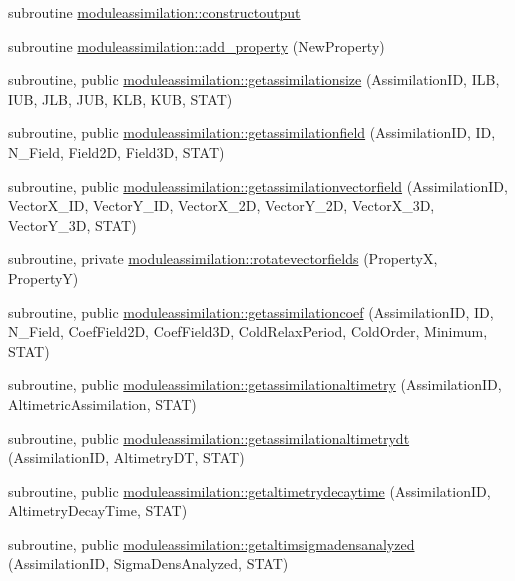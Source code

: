 \begin{DoxyCompactItemize}
\item 
subroutine \mbox{\hyperlink{namespacemoduleassimilation_a0290dba29cfc2f2e50954134308fdd93}{moduleassimilation\+::constructoutput}}
\item 
subroutine \mbox{\hyperlink{namespacemoduleassimilation_a59854402d2db7e0920208b8293922fc2}{moduleassimilation\+::add\+\_\+property}} (New\+Property)
\item 
subroutine, public \mbox{\hyperlink{namespacemoduleassimilation_a9dcf23578dc00d565791f0b2ce1edc7d}{moduleassimilation\+::getassimilationsize}} (Assimilation\+ID, I\+LB, I\+UB, J\+LB, J\+UB, K\+LB, K\+UB, S\+T\+AT)
\item 
subroutine, public \mbox{\hyperlink{namespacemoduleassimilation_aa6ac00eae8c819e287924553d8d10638}{moduleassimilation\+::getassimilationfield}} (Assimilation\+ID, ID, N\+\_\+\+Field, Field2D, Field3D, S\+T\+AT)
\item 
subroutine, public \mbox{\hyperlink{namespacemoduleassimilation_a3f99df6f8207db00fe69fa4d172335b1}{moduleassimilation\+::getassimilationvectorfield}} (Assimilation\+ID, Vector\+X\+\_\+\+ID, Vector\+Y\+\_\+\+ID, Vector\+X\+\_\+2D, Vector\+Y\+\_\+2D, Vector\+X\+\_\+3D, Vector\+Y\+\_\+3D, S\+T\+AT)
\item 
subroutine, private \mbox{\hyperlink{namespacemoduleassimilation_a91d65081df0418d8a1b46cb4548710f3}{moduleassimilation\+::rotatevectorfields}} (PropertyX, PropertyY)
\item 
subroutine, public \mbox{\hyperlink{namespacemoduleassimilation_aeb67db12f57e948ab0d21c07cf0f3ee4}{moduleassimilation\+::getassimilationcoef}} (Assimilation\+ID, ID, N\+\_\+\+Field, Coef\+Field2D, Coef\+Field3D, Cold\+Relax\+Period, Cold\+Order, Minimum, S\+T\+AT)
\item 
subroutine, public \mbox{\hyperlink{namespacemoduleassimilation_ae8923d911da53170ca8bc79256ecfaee}{moduleassimilation\+::getassimilationaltimetry}} (Assimilation\+ID, Altimetric\+Assimilation, S\+T\+AT)
\item 
subroutine, public \mbox{\hyperlink{namespacemoduleassimilation_a4c4fab1da99106327a65575667e03252}{moduleassimilation\+::getassimilationaltimetrydt}} (Assimilation\+ID, Altimetry\+DT, S\+T\+AT)
\item 
subroutine, public \mbox{\hyperlink{namespacemoduleassimilation_aaab7e59362629aa1c11d99a2b3b6ad30}{moduleassimilation\+::getaltimetrydecaytime}} (Assimilation\+ID, Altimetry\+Decay\+Time, S\+T\+AT)
\item 
subroutine, public \mbox{\hyperlink{namespacemoduleassimilation_a49834c1e597575cf155649b2bfe4321b}{moduleassimilation\+::getaltimsigmadensanalyzed}} (Assimilation\+ID, Sigma\+Dens\+Analyzed, S\+T\+AT)

\end{DoxyCompactItemize}
